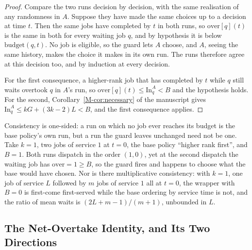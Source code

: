 \documentclass[mathematics,supfile,submit,moreauthors]{Definitions/mdpi}
\begin{document}
\begin{proof}
Compare the two runs decision by decision, with the same realisation of any randomness
in $A$. Suppose they have made the same choices up to a decision at time $t$. Then the
same jobs have completed by $t$ in both runs, so $\mathrm{over}[q](t)$ is the same in both
for every waiting job $q$, and by hypothesis it is below $\mathrm{budget}(q,t)$. No job is
eligible, so the guard lets $A$ choose, and $A$, seeing the same history, makes the choice
it makes in its own run. The runs therefore agree at this decision too, and by induction
at every decision.

For the first consequence, a higher-rank job that has completed by $t$ while $q$ still
waits overtook $q$ in $A$'s run, so $\mathrm{over}[q](t) \le \mathrm{In}^A_q < B$ and the
hypothesis holds. For the second, Corollary~\ref*{M-cor:necessary} of the manuscript gives
$\mathrm{In}^A_q \le kG + (3k-2)L < B$, and the first consequence applies.
\end{proof}

Consistency is one-sided: a run on which no job ever reaches its budget is the base
policy's own run, but a run the guard leaves unchanged need not be one. Take $k = 1$, two jobs of
service $1$ at $t = 0$, the base policy ``higher rank first'', and $B = 1$. Both
runs dispatch in the order $(1,0)$, yet at the second dispatch the waiting job
has $\mathrm{over} = 1 \ge B$, so the guard fires and happens to choose what the
base would have chosen. Nor is there multiplicative consistency: with $k = 1$,
one job of service $L$ followed by $m$ jobs of service $1$ all at $t = 0$, the
wrapper with $B = 0$ is first-come first-served while the base ordering by
service time is not, and the ratio of mean waits is $(2L + m - 1)/(m+1)$,
unbounded in $L$.


\subsection{The Net-Overtake Identity, and Its Two Directions}
\label{sec:supp_directions}
\end{document}
